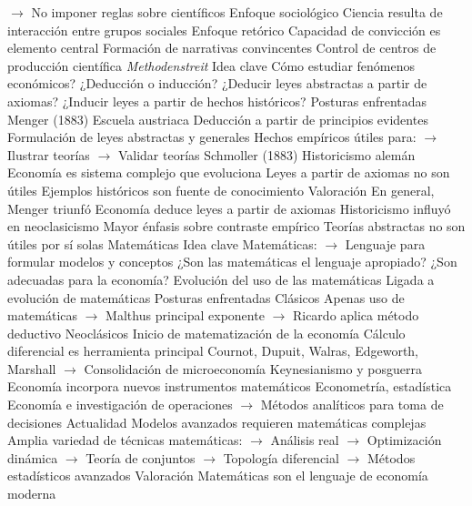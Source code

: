 \documentclass{nuevotema}
\begin{document}
\begin{esquemal}
				\4[] $\to$ No imponer reglas sobre científicos
			\3 Enfoque sociológico
				\4 Ciencia resulta de interacción entre grupos sociales
			\3 Enfoque retórico
				\4 Capacidad de convicción es elemento central
				\4 Formación de narrativas convincentes
				\4 Control de centros de producción científica
	\1 
		\2 \textit{Methodenstreit}
			\3 Idea clave
				\4 Cómo estudiar fenómenos económicos?
				\4[] ¿Deducción o inducción?
				\4 ¿Deducir leyes abstractas a partir de axiomas?
				\4 ¿Inducir leyes a partir de hechos históricos?
			\3 Posturas enfrentadas
				\4 Menger (1883)
				\4[] Escuela austriaca
				\4[] Deducción a partir de principios evidentes
				\4[] Formulación de leyes abstractas y generales
				\4[] Hechos empíricos útiles para:
				\4[] $\to$ Ilustrar teorías
				\4[] $\to$ Validar teorías
				\4 Schmoller (1883)
				\4[] Historicismo alemán
				\4[] Economía es sistema complejo que evoluciona
				\4[] Leyes a partir de axiomas no son útiles
				\4[] Ejemplos históricos son fuente de conocimiento
			\3 Valoración
				\4 En general, Menger triunfó
				\4[] Economía deduce leyes a partir de axiomas
				\4 Historicismo influyó en neoclasicismo
				\4[] Mayor énfasis sobre contraste empírico
				\4[] Teorías abstractas no son útiles por sí solas
		\2 Matemáticas
			\3 Idea clave
				\4 Matemáticas:
				\4[] $\to$ Lenguaje para formular modelos y conceptos
				\4 ¿Son las matemáticas el lenguaje apropiado?
				\4 ¿Son adecuadas para la economía?
				\4 Evolución del uso de las matemáticas
				\4[] Ligada a evolución de matemáticas
			\3 Posturas enfrentadas
				\4 Clásicos
				\4[] Apenas uso de matemáticas
				\4[] $\to$ Malthus principal exponente
				\4[] $\to$ Ricardo aplica método deductivo
				\4 Neoclásicos
				\4[] Inicio de matematización de la economía
				\4[] Cálculo diferencial es herramienta principal
				\4[] Cournot, Dupuit, Walras, Edgeworth, Marshall
				\4[] $\to$ Consolidación de microeconomía
				\4 Keynesianismo y posguerra
				\4[] Economía incorpora nuevos instrumentos matemáticos
				\4[] Econometría, estadística
				\4[] Economía e investigación de operaciones
				\4[] $\to$ Métodos analíticos para toma de decisiones
				\4 Actualidad
				\4[] Modelos avanzados requieren matemáticas complejas
				\4[] Amplia variedad de técnicas matemáticas:
				\4[] $\to$ Análisis real
				\4[] $\to$ Optimización dinámica
				\4[] $\to$ Teoría de conjuntos
				\4[] $\to$ Topología diferencial
				\4[] $\to$ Métodos estadísticos avanzados
			\3 Valoración
				\4 Matemáticas son el lenguaje de economía moderna

\end{esquemal}
\end{document}
